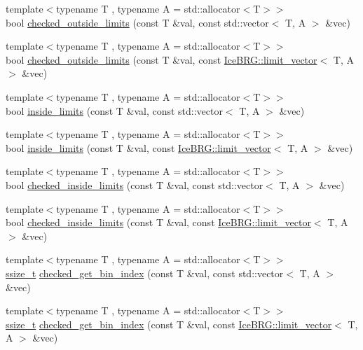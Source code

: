 \begin{DoxyCompactItemize}
\item 
{\footnotesize template$<$typename T , typename A  = std\-::allocator$<$\-T$>$$>$ }\\bool \hyperlink{namespaceIceBRG_af9e798dd462260ac34c932996d36253b}{checked\-\_\-outside\-\_\-limits} (const T \&val, const std\-::vector$<$ T, A $>$ \&vec)
\item 
{\footnotesize template$<$typename T , typename A  = std\-::allocator$<$\-T$>$$>$ }\\bool \hyperlink{namespaceIceBRG_a35d96508b6d0d95ac5dbc965954b6938}{checked\-\_\-outside\-\_\-limits} (const T \&val, const \hyperlink{classIceBRG_1_1limit__vector}{Ice\-B\-R\-G\-::limit\-\_\-vector}$<$ T, A $>$ \&vec)
\item 
{\footnotesize template$<$typename T , typename A  = std\-::allocator$<$\-T$>$$>$ }\\bool \hyperlink{namespaceIceBRG_a5ce044d37b6efa63d34670eb7c2c6bf9}{inside\-\_\-limits} (const T \&val, const std\-::vector$<$ T, A $>$ \&vec)
\item 
{\footnotesize template$<$typename T , typename A  = std\-::allocator$<$\-T$>$$>$ }\\bool \hyperlink{namespaceIceBRG_a3c1033698095dfc69d4c1a1403e1e70f}{inside\-\_\-limits} (const T \&val, const \hyperlink{classIceBRG_1_1limit__vector}{Ice\-B\-R\-G\-::limit\-\_\-vector}$<$ T, A $>$ \&vec)
\item 
{\footnotesize template$<$typename T , typename A  = std\-::allocator$<$\-T$>$$>$ }\\bool \hyperlink{namespaceIceBRG_afce5f1508d70c6254391c86630328f54}{checked\-\_\-inside\-\_\-limits} (const T \&val, const std\-::vector$<$ T, A $>$ \&vec)
\item 
{\footnotesize template$<$typename T , typename A  = std\-::allocator$<$\-T$>$$>$ }\\bool \hyperlink{namespaceIceBRG_a86067823c6cae3f38101cc1c5236519c}{checked\-\_\-inside\-\_\-limits} (const T \&val, const \hyperlink{classIceBRG_1_1limit__vector}{Ice\-B\-R\-G\-::limit\-\_\-vector}$<$ T, A $>$ \&vec)
\item 
{\footnotesize template$<$typename T , typename A  = std\-::allocator$<$\-T$>$$>$ }\\\hyperlink{lib_2IceBRG__main_2common_8h_ab322a3e50421dc5f0c43316b1b373592}{ssize\-\_\-t} \hyperlink{namespaceIceBRG_acc5bf8baaf034d42a26d9409eb60850d}{checked\-\_\-get\-\_\-bin\-\_\-index} (const T \&val, const std\-::vector$<$ T, A $>$ \&vec)
\item 
{\footnotesize template$<$typename T , typename A  = std\-::allocator$<$\-T$>$$>$ }\\\hyperlink{lib_2IceBRG__main_2common_8h_ab322a3e50421dc5f0c43316b1b373592}{ssize\-\_\-t} \hyperlink{namespaceIceBRG_a62d9df0114c29f79ae77142c455ea324}{checked\-\_\-get\-\_\-bin\-\_\-index} (const T \&val, const \hyperlink{classIceBRG_1_1limit__vector}{Ice\-B\-R\-G\-::limit\-\_\-vector}$<$ T, A $>$ \&vec)

\end{DoxyCompactItemize}
